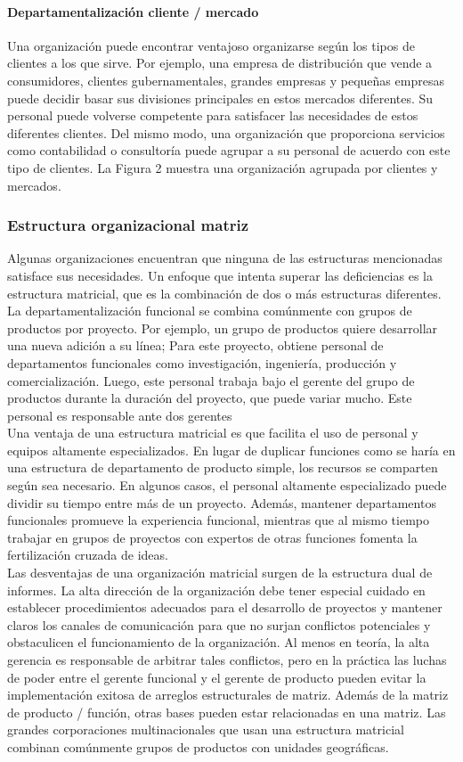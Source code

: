 \documentclass[10pt]{book}
\begin{document}
\paragraph{Departamentalización cliente / mercado}
Una organización puede encontrar ventajoso organizarse según los tipos de clientes a los que sirve. Por ejemplo, una empresa de distribución que vende a consumidores, clientes gubernamentales, grandes empresas y pequeñas empresas puede decidir basar sus divisiones principales en estos mercados diferentes. Su personal puede volverse competente para satisfacer las necesidades de estos diferentes clientes. Del mismo modo, una organización que proporciona servicios como contabilidad o consultoría puede agrupar a su personal de acuerdo con este tipo de clientes. La Figura 2 muestra una organización agrupada por clientes y mercados.
\subsubsection{Estructura organizacional matriz}
Algunas organizaciones encuentran que ninguna de las estructuras mencionadas satisface sus necesidades. Un enfoque que intenta superar las deficiencias es la estructura matricial, que es la combinación de dos o más estructuras diferentes. La departamentalización funcional se combina comúnmente con grupos de productos por proyecto. Por ejemplo, un grupo de productos quiere desarrollar una nueva adición a su línea; Para este proyecto, obtiene personal de departamentos funcionales como investigación, ingeniería, producción y comercialización. Luego, este personal trabaja bajo el gerente del grupo de productos durante la duración del proyecto, que puede variar mucho. Este personal es responsable ante dos gerentes \\
Una ventaja de una estructura matricial es que facilita el uso de personal y equipos altamente especializados. En lugar de duplicar funciones como se haría en una estructura de departamento de producto simple, los recursos se comparten según sea necesario. En algunos casos, el personal altamente especializado puede dividir su tiempo entre más de un proyecto. Además, mantener departamentos funcionales promueve la experiencia funcional, mientras que al mismo tiempo trabajar en grupos de proyectos con expertos de otras funciones fomenta la fertilización cruzada de ideas.\\
Las desventajas de una organización matricial surgen de la estructura dual de informes. La alta dirección de la organización debe tener especial cuidado en establecer procedimientos adecuados para el desarrollo de proyectos y mantener claros los canales de comunicación para que no surjan conflictos potenciales y obstaculicen el funcionamiento de la organización. Al menos en teoría, la alta gerencia es responsable de arbitrar tales conflictos, pero en la práctica las luchas de poder entre el gerente funcional y el gerente de producto pueden evitar la implementación exitosa de arreglos estructurales de matriz. Además de la matriz de producto / función, otras bases pueden estar relacionadas en una matriz. Las grandes corporaciones multinacionales que usan una estructura matricial combinan comúnmente grupos de productos con unidades geográficas.
\end{document}
